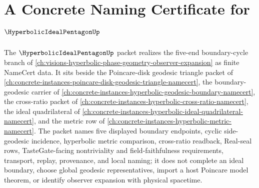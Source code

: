 \chapter{A Concrete Naming Certificate for $\HyperbolicIdealPentagonUp$}
\label{ch:concrete-instances-hyperbolic-ideal-pentagon-namecert}

The $\HyperbolicIdealPentagonUp$ packet realizes the five-end boundary-cycle branch of \autoref{ch:visions-hyperbolic-phase-geometry-observer-expansion} as finite NameCert data. It sits beside the Poincare-disk geodesic triangle packet of \autoref{ch:concrete-instances-poincare-disk-geodesic-triangle-namecert}, the boundary-geodesic carrier of \autoref{ch:concrete-instances-hyperbolic-geodesic-boundary-namecert}, the cross-ratio packet of \autoref{ch:concrete-instances-hyperbolic-cross-ratio-namecert}, the ideal quadrilateral of \autoref{ch:concrete-instances-hyperbolic-ideal-quadrilateral-namecert}, and the metric row of \autoref{ch:concrete-instances-hyperbolic-metric-namecert}. The packet names five displayed boundary endpoints, cyclic side-geodesic incidence, hyperbolic metric comparison, cross-ratio readback, Real-seal rows, TasteGate-facing nontriviality and field-faithfulness requirements, transport, replay, provenance, and local naming; it does not complete an ideal boundary, choose global geodesic representatives, import a host Poincare model theorem, or identify observer expansion with physical spacetime.

